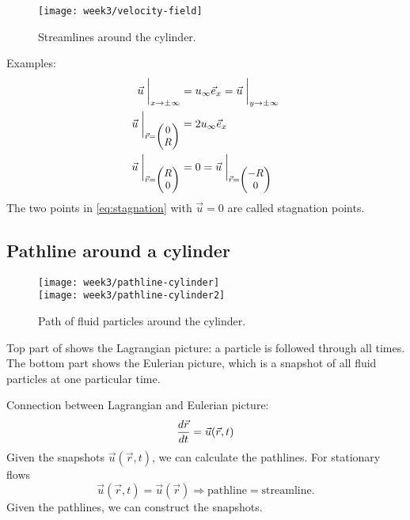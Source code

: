 \begin{figure}[!h]
    \centering
    \texttt{[image: week3/velocity-field]}
    \caption{Streamlines around the cylinder.}
    \label{fig:velocity-field2}
\end{figure}

Examples:
\begin{align}
\vec{u}\biggm\vert_{x\rightarrow\pm\infty} &= u_\infty\vec{e}_x = \vec{u}\biggm\vert_{y\rightarrow\pm\infty}\\
\vec{u}\biggm\vert_{\small\vec{r}=\begin{pmatrix} 0 \\ R
\end{pmatrix}} &= 2u_\infty\vec{e}_x \\
\vec{u}\biggm\vert_{\small\vec{r}=\begin{pmatrix} R \\ 0
\end{pmatrix}} &= 0 = \vec{u}\biggm\vert_{\small\vec{r}=\begin{pmatrix} -R \\ 0
\end{pmatrix}}\label{eq:stagnation}
\end{align}
The two points in \eqref{eq:stagnation} with $\vec{u}=0$ are called stagnation points.

\subsection{Pathline around a cylinder}
\begin{figure}[!h]
    \centering
    \texttt{[image: week3/pathline-cylinder]}\\
    \texttt{[image: week3/pathline-cylinder2]}
    \caption{Path of fluid particles around the cylinder.}
    \label{fig:pathline-cylinder}
\end{figure}
Top part of  shows the Lagrangian picture: a particle is followed through all times. The bottom part shows the Eulerian picture, which is a snapshot of all fluid particles at one particular time.

Connection between Lagrangian and Eulerian picture:
\begin{equation}
\frac{d \vec{r}}{d t} = \vec{u}(\vec{r},t)
\end{equation}
Given the snapshots $\vec{u}(\vec{r},t)$, we can calculate the pathlines. For stationary flows
\begin{equation}
\vec{u}(\vec{r},t)=\vec{u}(\vec{r}) \Rightarrow \mathrm{pathline} = \mathrm{streamline}.
\end{equation}
Given the pathlines, we can construct the snapshots.

